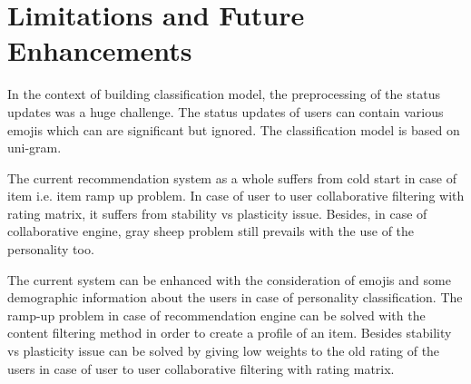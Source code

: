 \newpage
\section{Limitations and Future Enhancements}
In the context of building classification model, the preprocessing of the status updates was a huge challenge. The status updates of users can contain various emojis which can are significant but ignored. The classification model is based on uni-gram.

The current recommendation system as a whole suffers from cold start in case of item i.e. item ramp up problem. In case of user to user collaborative filtering with rating matrix, it suffers from stability vs plasticity issue. Besides, in case of collaborative engine, gray sheep problem still prevails with the use of the personality too.

The current system can be enhanced with the consideration of emojis and some demographic information about the users in case of personality classification. The ramp-up problem in case of recommendation engine can be solved with the content filtering method in order to create a profile of an item. Besides stability vs plasticity issue can be solved by giving low weights to the old rating of the users in case of user to user collaborative filtering with rating matrix.